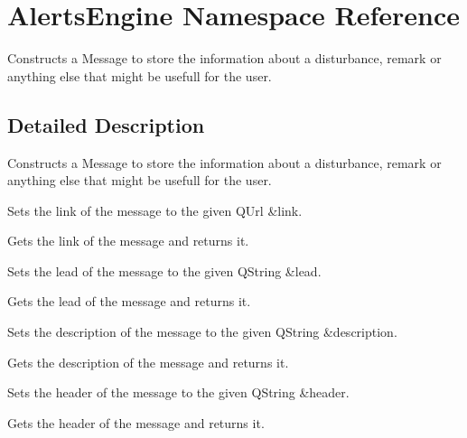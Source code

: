 \hypertarget{namespaceAlertsEngine}{}\section{Alerts\+Engine Namespace Reference}
\label{namespaceAlertsEngine}


Constructs a Message to store the information about a disturbance, remark or anything else that might be usefull for the user.  




\subsection{Detailed Description}
Constructs a Message to store the information about a disturbance, remark or anything else that might be usefull for the user. 

Sets the link of the message to the given Q\+Url \&link.

Gets the link of the message and returns it.

Sets the lead of the message to the given Q\+String \&lead.

Gets the lead of the message and returns it.

Sets the description of the message to the given Q\+String \&description.

Gets the description of the message and returns it.

Sets the header of the message to the given Q\+String \&header.

Gets the header of the message and returns it. 